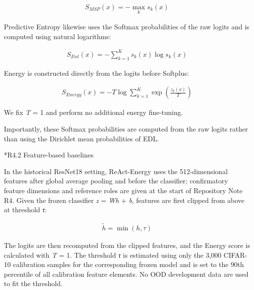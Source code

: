 \documentclass[11pt,a4paper]{article}
\makeatletter
\renewcommand\subsection{\@startsection{subsection}{2}{\z@}{-1.8ex plus -.5ex minus -.2ex}{.7ex plus .2ex}{\normalfont\normalsize\bfseries\raggedright}}
\makeatother
\begin{document}
\begin{equation}
\begin{array}{r}
S_{MSP}(x) = - \max_{k}s_{k}(x)
\end{array}
\label{eq:supp15}
\end{equation}

Predictive Entropy likewise uses the Softmax probabilities of the raw logits and is computed using natural logarithms:

\begin{equation}
\begin{array}{r}
S_{Ent}(x) = - \sum_{k = 1}^{K}s_{k}(x)\log s_{k}(x)
\end{array}
\label{eq:supp16}
\end{equation}

Energy is constructed directly from the logits before Softplus:

\begin{equation}
\begin{array}{r}
S_{Energy}(x) = - T\log{\sum_{k = 1}^{K}{\exp\left( \frac{z_{k}(x)}{T} \right)}}
\end{array}
\label{eq:supp17}
\end{equation}

We fix \emph{T} = 1 and perform no additional energy fine-tuning.

Importantly, these Softmax probabilities are computed from the raw logits rather than using the Dirichlet mean probabilities of EDL.

\subsection*{R4.2 Feature-based baselines}\label{s4.2-feature-based-baselines}

In the historical ResNet18 setting, ReAct-Energy uses the 512-dimensional features after global average pooling and before the classifier; confirmatory feature dimensions and reference roles are given at the start of Repository Note R4. Given the frozen classifier \emph{z} = \emph{Wh} + \emph{b}, features are first clipped from above at threshold \emph{τ}:

\begin{equation}
\begin{array}{r}
\widetilde{h} = \min(h,\tau)
\end{array}
\label{eq:supp18}
\end{equation}

The logits are then recomputed from the clipped features, and the Energy score is calculated with \emph{T} = 1. The threshold \emph{τ} is estimated using only the 3,000 CIFAR-10 calibration samples for the corresponding frozen model and is set to the 90th percentile of all calibration feature elements. No OOD development data are used to fit the threshold.
\end{document}
